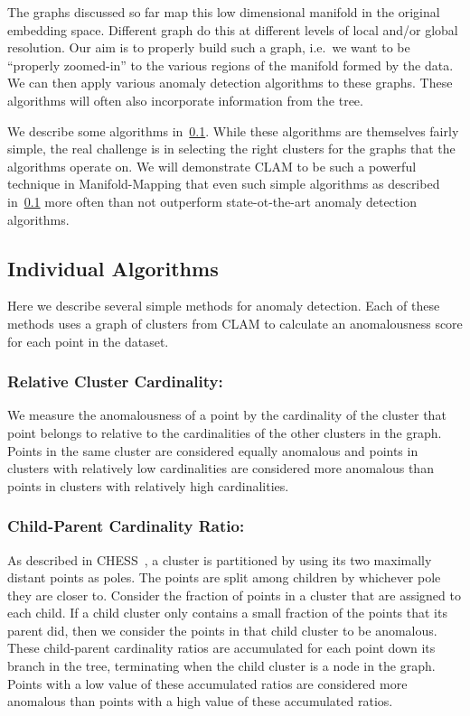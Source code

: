The graphs discussed so far map this low dimensional manifold in the original embedding space.
Different graph do this at different levels of local and/or global resolution.
Our aim is to properly build such a graph, i.e.\ we want to be ``properly zoomed-in'' to the various regions of the manifold formed by the data.
We can then apply various anomaly detection algorithms to these graphs.
These algorithms will often also incorporate information from the tree.

We describe some algorithms in~\ref{subsec:methods:individual-algorithms}.
While these algorithms are themselves fairly simple, the real challenge is in selecting the right clusters for the graphs that the algorithms operate on.
We will demonstrate CLAM to be such a powerful technique in Manifold-Mapping that even such simple algorithms as described in~\ref{subsec:methods:individual-algorithms} more often than not outperform state-ot-the-art anomaly detection algorithms.

\subsection{Individual Algorithms}
\label{subsec:methods:individual-algorithms}

Here we describe several simple methods for anomaly detection.
Each of these methods uses a graph of clusters from CLAM to calculate an anomalousness score for each point in the dataset.

\subsubsection{Relative Cluster Cardinality:}
We measure the anomalousness of a point by the cardinality of the cluster that point belongs to relative to the cardinalities of the other clusters in the graph.
Points in the same cluster are considered equally anomalous and points in clusters with relatively low cardinalities are considered more anomalous than points in clusters with relatively high cardinalities.

\subsubsection{Child-Parent Cardinality Ratio:}
As described in CHESS~\cite{ishaq2019entropy}, a cluster is partitioned by using its two maximally distant points as poles.
The points are split among children by whichever pole they are closer to.
Consider the fraction of points in a cluster that are assigned to each child.
If a child cluster only contains a small fraction of the points that its parent did, then we consider the points in that child cluster to be anomalous.
These child-parent cardinality ratios are accumulated for each point down its branch in the tree, terminating when the child cluster is a node in the graph.
Points with a low value of these accumulated ratios are considered more anomalous than points with a high value of these accumulated ratios.

